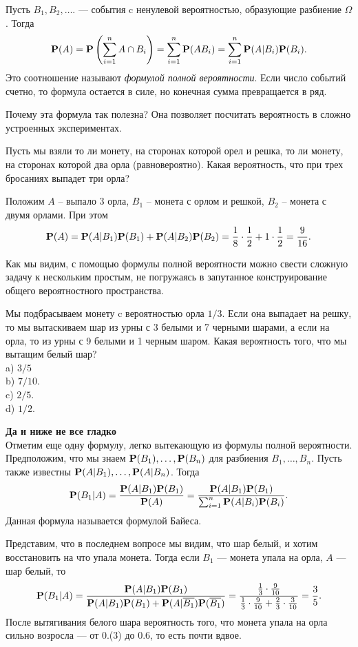 \documentclass[11 pt,russian]{article}
\begin{document}
Пусть $B_1,B_2,\dotsc.$ --- события c ненулевой вероятностью, образующие разбиение $\Omega$. Тогда
$$
{\bf P}(A) = {\bf P}\left(\sum_{i=1}^{n} A\cap B_i\right) =
 \sum_{i=1}^{n} {\bf P}(AB_i) = \sum_{i=1}^{n} {\bf P}(A|B_i){\bf P}(B_i).
$$
Это соотношение называют {\it формулой полной вероятности}. Если число событий счетно, то формула остается в силе, но конечная сумма превращается в ряд.

Почему эта формула так полезна? Она позволяет посчитать вероятность в сложно устроенных экспериментах. 
\begin{Exam}
Пусть мы взяли то ли монету, на сторонах которой орел и решка, то ли монету, на сторонах которой два орла (равновероятно). Какая вероятность, что при трех бросаниях выпадет три орла?

Положим $A$ -- выпало 3 орла, $B_1$ -- монета с орлом и решкой, $B_2$ -- монета с двумя орлами. При этом 
$$
{\bf P}(A) = {\bf P}(A|B_1) {\bf P}(B_1) + {\bf P}(A|B_2) {\bf P}(B_2) = \frac{1}{8} \cdot \frac12 + 1\cdot \frac12 = \frac{9}{16}.
$$ 
\end{Exam}
Как мы видим, с помощью формулы полной вероятности можно свести сложную задачу к нескольким простым, не погружаясь в запутанное конструирование общего вероятностного пространства.
\begin{Que}
Мы подбрасываем монету c вероятностью орла $1/3$. Если она выпадает на решку, то мы вытаскиваем шар из урны с 3 белыми и 7 черными шарами, а если на орла, то из урны с 9 белыми и 1 черным шаром. Какая вероятность того, что мы вытащим белый шар?\\
a) $3/5$\\
b) $7/10$.\\
c) $2/5$.\\
d) $1/2$.
\end{Que}
{\bf Да и ниже не все гладко\\ }
Отметим еще одну формулу, легко вытекающую из формулы полной вероятности. Предположим, что мы знаем ${\bf P}(B_1),\dotsc,{\bf P}(B_n)$ для разбиения $B_1, \dotsc ,B_n$. Пусть также известны ${\bf P}(A|B_1),\dotsc,{\bf P}(A|B_n)$. Тогда 
$$
{\bf P}(B_1|A) = \frac{{\bf P}(A|B_1) {\bf P}(B_1)}{{\bf P}(A)} = \frac{{\bf P}(A|B_1) {\bf P}(B_1) }{\sum_{i=1}^{n} {\bf P}(A|B_i) {\bf P}(B_i)}.
$$
Данная формула называется формулой Байеса.
\begin{Exam}
Представим, что в последнем вопросе мы видим, что шар белый, и хотим восстановить на что упала монета. Тогда если $B_1$ --- монета упала на орла, $A$ --- шар белый, 
то
$$
{\bf P}(B_1|A) = \frac{{\bf P}(A|B_1) {\bf P}(B_1)}{{\bf P}(A|B_1) {\bf P}(B_1)+{\bf P}(A|\overline{B_1}) {\bf P}(\overline{B_1})} = \frac{\frac13 \cdot \frac{9}{10}}{\frac13 \cdot \frac{9}{10} + \frac23 \cdot \frac{3}{10}} = \frac{3}{5}.
$$
После вытягивания белого шара вероятность того, что монета упала на орла сильно возросла --- от 0.(3) до 0.6, то есть почти вдвое.
\end{Exam}
\end{document}
